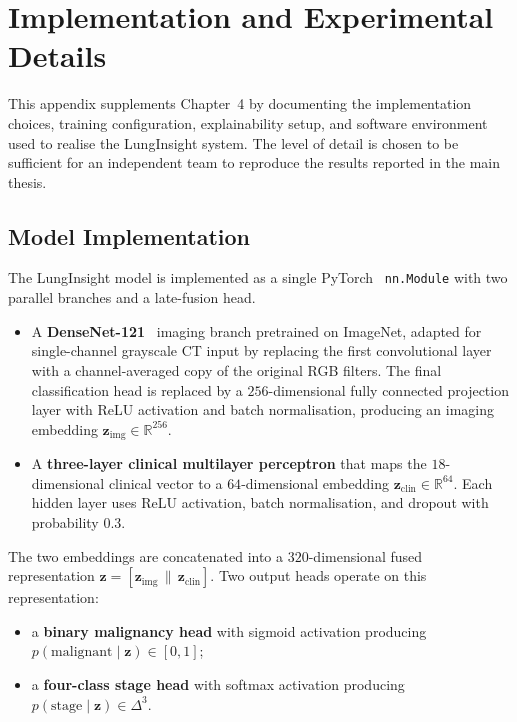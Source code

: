 ﻿\chapter{Implementation and Experimental Details}
\label{ch:impl-details}
\thispagestyle{empty}

This appendix supplements Chapter~4 by documenting the implementation
choices, training configuration, explainability setup, and software
environment used to realise the LungInsight system. The level of detail is
chosen to be sufficient for an independent team to reproduce the results
reported in the main thesis.

\section{Model Implementation}
\label{sec:appB-model}

The LungInsight model is implemented as a single PyTorch~\cite{paszke2019pytorch}
\texttt{nn.Module} with two parallel branches and a late-fusion head.

\begin{itemize}
    \item A \textbf{DenseNet-121}~\cite{huang2017densely} imaging branch
          pretrained on ImageNet, adapted for single-channel grayscale CT
          input by replacing the first convolutional layer with a
          channel-averaged copy of the original RGB filters. The final
          classification head is replaced by a $256$-dimensional fully
          connected projection layer with ReLU activation and batch
          normalisation, producing an imaging embedding
          $\mathbf{z}_{\text{img}} \in \mathbb{R}^{256}$.
    \item A \textbf{three-layer clinical multilayer perceptron} that maps the
          $18$-dimensional clinical vector to a $64$-dimensional embedding
          $\mathbf{z}_{\text{clin}} \in \mathbb{R}^{64}$. Each hidden layer
          uses ReLU activation, batch normalisation, and dropout with
          probability $0.3$.
\end{itemize}

The two embeddings are concatenated into a $320$-dimensional fused
representation $\mathbf{z} = [\mathbf{z}_{\text{img}} \,\|\, \mathbf{z}_{\text{clin}}]$.
Two output heads operate on this representation:

\begin{itemize}
    \item a \textbf{binary malignancy head} with sigmoid activation producing
          $p(\text{malignant} \mid \mathbf{z}) \in [0, 1]$;
    \item a \textbf{four-class stage head} with softmax activation producing
          $p(\text{stage} \mid \mathbf{z}) \in \Delta^{3}$.
\end{itemize}

